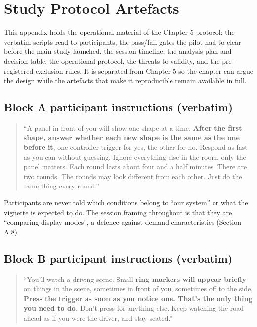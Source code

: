 \chapter{Study Protocol Artefacts}

This appendix holds the operational material of the Chapter 5 protocol: the verbatim scripts read to
participants, the pass/fail gates the pilot had to clear before the main study launched, the session
timeline, the analysis plan and decision table, the operational protocol, the threats to validity,
and the pre-registered exclusion rules. It is separated from Chapter 5 so the chapter can argue the
design while the artefacts that make it reproducible remain available in full.


\section{Block A participant instructions (verbatim)}

\begin{quote}
``A panel in front of you will show one shape at a time. \textbf{After the first shape, answer whether
each new shape is the same as the one before it}, one controller trigger for yes, the other for
no. Respond as fast as you can without guessing. Ignore everything else in the room, only the
panel matters. Each round lasts about four and a half minutes. There are two rounds. The rounds
may look different from each other. Just do the same thing every round.''
\end{quote}

Participants are never told which conditions belong to ``our system'' or what the vignette is expected
to do. The session framing throughout is that they are ``comparing display modes'', a defence against
demand characteristics (Section A.8).


\section{Block B participant instructions (verbatim)}

\begin{quote}
``You'll watch a driving scene. Small \textbf{ring markers will appear briefly} on things in the
scene, sometimes in front of you, sometimes off to the side. \textbf{Press the trigger as soon as
you notice one. That's the only thing you need to do.} Don't press for anything else. Keep watching
the road ahead as if you were the driver, and stay seated.''
\end{quote}


